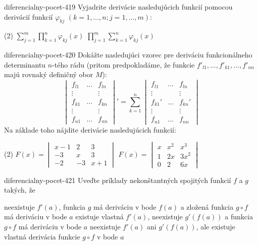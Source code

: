 \begin{defproblem}{diferencialny-pocet-419}
Vyjadrite derivácie nasledujúcich funkcií pomocou derivácií funkcií
$\varphi_{kj}$ $(k=1,...,n; j=1,...,m)$:
\begin{tasks}(2)
  \task $\sum_{j=1}^{m}\prod_{k=1}^n \varphi_{kj}(x)$
  \task $\prod_{j=1}^{m}\sum_{k=1}^n \varphi_{kj}(x)$
\end{tasks}
\end{defproblem}

\begin{defproblem}{diferencialny-pocet-420}
Dokážte nasledujúci vzorec pre deriváciu funkcionálneho determinantu $n$-tého
rádu (pritom predpokladáme, že funkcie $f'_{l1},...,f'_{k1},...,f'_{nn}$ majú
rovnaký definičný obor $M$):
\[
  \begin{vmatrix}
    f_{l1} & \dots & f_{ln} \\
    \vdots & & \vdots\\
    f_{k1} & \dots & f_{kn} \\
    \vdots & & \vdots\\
    f_{n1} & \dots & f_{nn}
  \end{vmatrix}'
  = \sum_{k=1}^n
  \begin{vmatrix}
  f_{l1} & \dots & f_{ln} \\
  \vdots & & \vdots\\
  f_{k1}' & \dots & f_{kn}' \\
  \vdots & & \vdots\\
  f_{n1} & \dots & f_{nn}
  \end{vmatrix}
\]
Na základe toho nájdite derivácie nasledujúcich funkcií:
\begin{tasks}(2)
\task $F(x)=
\begin{vmatrix}
x-1 & 2 & 3 \\
-3 & x & 3 \\
-2 & -3 & x+1
\end{vmatrix}$
\task $F(x)=
\begin{vmatrix}
x & x^2 & x^3 \\
1 & 2x & 3x^2 \\
0 & 2 & 6x
\end{vmatrix}$
\end{tasks}
\end{defproblem}

\begin{defproblem}{diferencialny-pocet-421}
Uveďte príklady nekonštantných spojitých funkcií $f$ a $g$ takých, že
\begin{tasks}
\task
  neexistuje $f'(a)$, funkcia $g$ má deriváciu v bode $f(a)$ a zložená funkcia
  $g\circ f$ má deriváciu v bode $a$
\task
  existuje vlastná $f'(a)$, neexistuje $g'(f(a))$ a funkcia $g\circ f$ má
  deriváciu v bode $a$
\task
  neexistuje $f'(a)$ ani $g'(f(a))$, ale existuje vlastná derivácia funkcie
  $g\circ f$ v bode $a$
\end{tasks}
\end{defproblem}

